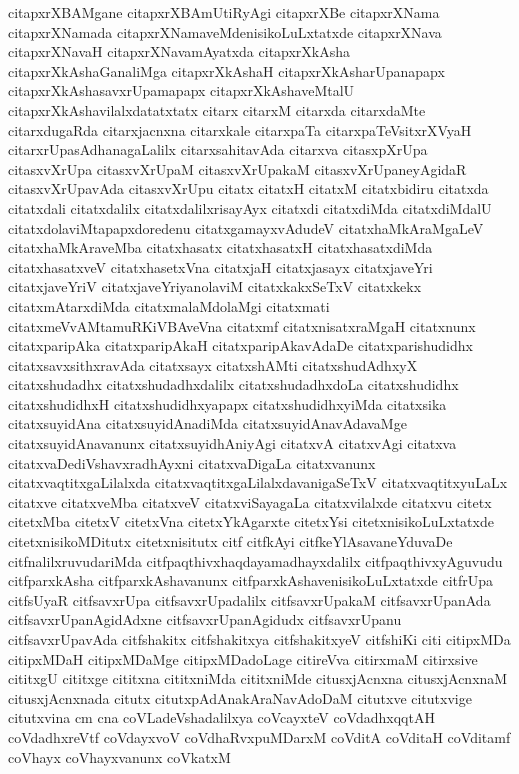 {citapxrXBAMgane
citapxrXBAmUtiRyAgi
citapxrXBe
citapxrXNama
citapxrXNamada
citapxrXNamaveMdenisikoLuLxtatxde
citapxrXNava
citapxrXNavaH
citapxrXNavamAyatxda
citapxrXkAsha
citapxrXkAshaGanaliMga
citapxrXkAshaH
citapxrXkAsharUpanapapx
citapxrXkAshasavxrUpamapapx
citapxrXkAshaveMtalU
citapxrXkAshavilalxdatatxtatx
citarx
citarxM
citarxda
citarxdaMte
citarxdugaRda
citarxjacnxna
citarxkale
citarxpaTa
citarxpaTeVsitxrXVyaH
citarxrUpasAdhanagaLalilx
citarxsahitavAda
citarxva
citasxpXrUpa
citasxvXrUpa
citasxvXrUpaM
citasxvXrUpakaM
citasxvXrUpaneyAgidaR
citasxvXrUpavAda
citasxvXrUpu
citatx
citatxH
citatxM
citatxbidiru
citatxda
citatxdali
citatxdalilx
citatxdalilxrisayAyx
citatxdi
citatxdiMda
citatxdiMdalU
citatxdolaviMtapapxdoredenu
citatxgamayxvAdudeV
citatxhaMkAraMgaLeV
citatxhaMkAraveMba
citatxhasatx
citatxhasatxH
citatxhasatxdiMda
citatxhasatxveV
citatxhasetxVna
citatxjaH
citatxjasayx
citatxjaveYri
citatxjaveYriV
citatxjaveYriyanolaviM
citatxkakxSeTxV
citatxkekx
citatxmAtarxdiMda
citatxmalaMdolaMgi
citatxmati
citatxmeVvAMtamuRKiVBAveVna
citatxmf
citatxnisatxraMgaH
citatxnunx
citatxparipAka
citatxparipAkaH
citatxparipAkavAdaDe
citatxparishudidhx
citatxsavxsithxravAda
citatxsayx
citatxshAMti
citatxshudAdhxyX
citatxshudadhx
citatxshudadhxdalilx
citatxshudadhxdoLa
citatxshudidhx
citatxshudidhxH
citatxshudidhxyapapx
citatxshudidhxyiMda
citatxsika
citatxsuyidAna
citatxsuyidAnadiMda
citatxsuyidAnavAdavaMge
citatxsuyidAnavanunx
citatxsuyidhAniyAgi
citatxvA
citatxvAgi
citatxva
citatxvaDediVshavxradhAyxni
citatxvaDigaLa
citatxvanunx
citatxvaqtitxgaLilalxda
citatxvaqtitxgaLilalxdavanigaSeTxV
citatxvaqtitxyuLaLx
citatxve
citatxveMba
citatxveV
citatxviSayagaLa
citatxvilalxde
citatxvu
citetx
citetxMba
citetxV
citetxVna
citetxYkAgarxte
citetxYsi
citetxnisikoLuLxtatxde
citetxnisikoMDitutx
citetxnisitutx
citf
citfkAyi
citfkeYlAsavaneYduvaDe
citfnalilxruvudariMda
citfpaqthivxhaqdayamadhayxdalilx
citfpaqthivxyAguvudu
citfparxkAsha
citfparxkAshavanunx
citfparxkAshavenisikoLuLxtatxde
citfrUpa
citfsUyaR
citfsavxrUpa
citfsavxrUpadalilx
citfsavxrUpakaM
citfsavxrUpanAda
citfsavxrUpanAgidAdxne
citfsavxrUpanAgidudx
citfsavxrUpanu
citfsavxrUpavAda
citfshakitx
citfshakitxya
citfshakitxyeV
citfshiKi
citi
citipxMDa
citipxMDaH
citipxMDaMge
citipxMDadoLage
citireVva
citirxmaM
citirxsive
cititxgU
cititxge
cititxna
cititxniMda
cititxniMde
citusxjAcnxna
citusxjAcnxnaM
citusxjAcnxnada
citutx
citutxpAdAnakAraNavAdoDaM
citutxve
citutxvige
citutxvina
cm
cna
coVLadeVshadalilxya
coVcayxteV
coVdadhxqqtAH
coVdadhxreVtf
coVdayxvoV
coVdhaRvxpuMDarxM
coVditA
coVditaH
coVditamf
coVhayx
coVhayxvanunx
coVkatxM
}
